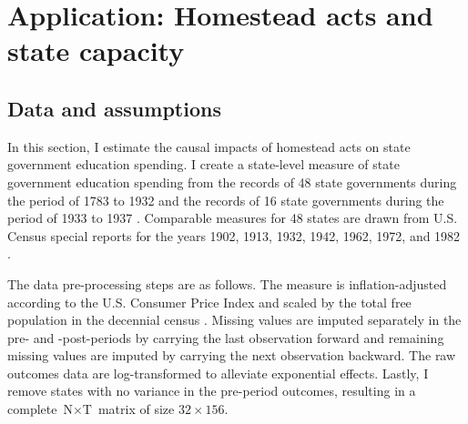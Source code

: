 \documentclass[hidelinks,12pt]{article}
\begin{document}
\section{Application: Homestead acts and state capacity} \label{state-capacity}





\subsection{Data and assumptions}

In this section, I estimate the causal impacts of homestead acts on state government education spending. I create a state-level measure of state government education spending from the records of 48 state governments during the period of 1783 to 1932 \citep{sylla1993sources} and the records of 16 state governments during the period of 1933 to 1937 \citep{sylla1995sourcesa,sylla1995sourcesb}. Comparable measures for 48 states are drawn from U.S. Census special reports for the years 1902, 1913, 1932, 1942, 1962, 1972, and 1982 \citep{haines2010}.

The data pre-processing steps are as follows. The measure is inflation-adjusted according to the U.S. Consumer Price Index \citep{williamson2017seven} and scaled by the total free population in the decennial census \citep{haines2010}. Missing values are imputed separately in the pre- and -post-periods by carrying the last observation forward and remaining missing values are imputed by carrying the next observation backward. The raw outcomes data are log-transformed to alleviate exponential effects. Lastly, I remove states with no variance in the pre-period outcomes, resulting in a complete $\text{N} \times \text{T}$ matrix of size $32 \times 156$. 
\end{document}
